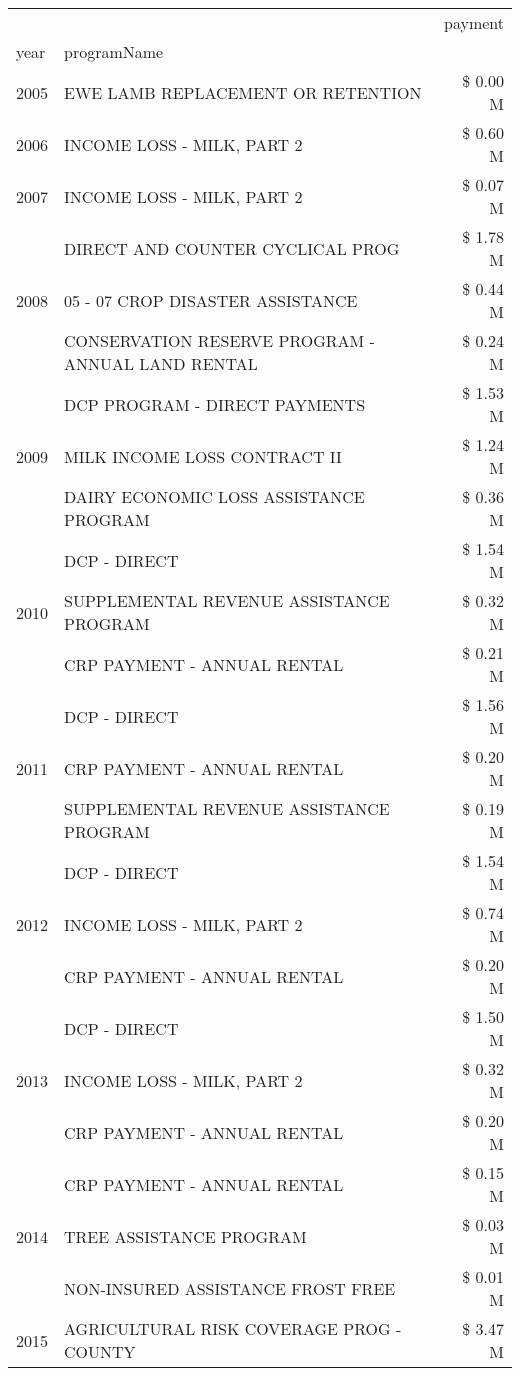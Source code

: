 \begin{tabular}{llr}
\toprule
 &  & payment \\
year & programName &  \\
\midrule
2005 & EWE LAMB REPLACEMENT OR RETENTION & \$ 0.00 M \\
\cline{1-3}
2006 & INCOME LOSS - MILK, PART 2 & \$ 0.60 M \\
\cline{1-3}
2007 & INCOME LOSS - MILK, PART 2 & \$ 0.07 M \\
\cline{1-3}
\multirow[t]{3}{*}{2008} & DIRECT AND COUNTER CYCLICAL PROG & \$ 1.78 M \\
 & 05 - 07 CROP DISASTER ASSISTANCE & \$ 0.44 M \\
 & CONSERVATION RESERVE PROGRAM - ANNUAL LAND RENTAL & \$ 0.24 M \\
\cline{1-3}
\multirow[t]{3}{*}{2009} & DCP PROGRAM - DIRECT PAYMENTS & \$ 1.53 M \\
 & MILK INCOME LOSS CONTRACT II & \$ 1.24 M \\
 & DAIRY ECONOMIC LOSS ASSISTANCE PROGRAM & \$ 0.36 M \\
\cline{1-3}
\multirow[t]{3}{*}{2010} & DCP - DIRECT & \$ 1.54 M \\
 & SUPPLEMENTAL REVENUE ASSISTANCE PROGRAM & \$ 0.32 M \\
 & CRP PAYMENT - ANNUAL RENTAL & \$ 0.21 M \\
\cline{1-3}
\multirow[t]{3}{*}{2011} & DCP - DIRECT & \$ 1.56 M \\
 & CRP PAYMENT - ANNUAL RENTAL & \$ 0.20 M \\
 & SUPPLEMENTAL REVENUE ASSISTANCE PROGRAM & \$ 0.19 M \\
\cline{1-3}
\multirow[t]{3}{*}{2012} & DCP - DIRECT & \$ 1.54 M \\
 & INCOME LOSS - MILK, PART 2 & \$ 0.74 M \\
 & CRP PAYMENT - ANNUAL RENTAL & \$ 0.20 M \\
\cline{1-3}
\multirow[t]{3}{*}{2013} & DCP - DIRECT & \$ 1.50 M \\
 & INCOME LOSS - MILK, PART 2 & \$ 0.32 M \\
 & CRP PAYMENT - ANNUAL RENTAL & \$ 0.20 M \\
\cline{1-3}
\multirow[t]{3}{*}{2014} & CRP PAYMENT - ANNUAL RENTAL & \$ 0.15 M \\
 & TREE ASSISTANCE PROGRAM & \$ 0.03 M \\
 & NON-INSURED ASSISTANCE FROST FREE & \$ 0.01 M \\
\cline{1-3}
\multirow[t]{3}{*}{2015} & AGRICULTURAL RISK COVERAGE PROG - COUNTY & \$ 3.47 M \\

\end{tabular}
